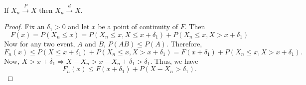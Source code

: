 \documentclass{article}
\begin{document}
\begin{prop}\label{c5p2}
If $X_n \stackrel{P}\rightarrow X$ then $X_n \stackrel{d}\rightarrow X$.
\end{prop}
\begin{proof}
Fix an $\delta_1 > 0$ and let $x$ be a point of continuity of $F$. Then
\[
F(x) = P(X_n \le x) = P(X_n \le x, X \le x + \delta_1) + 
P(X_n \le x, X > x + \delta_1)
\]
Now for any two event, $A$ and $B$, $P(AB) \le P(A)$. Therefore,
\[
F_n(x) \le P(X \le x + \delta_1) + P(X_n \le x, X > x + \delta_1) = 
F(x + \delta_1) + P(X_n \le x, X > x + \delta_1).
\]
Now, $X > x + \delta_1 \Rightarrow X - X_n > x - X_n + \delta_1 > \delta_1$.
Thus, we have
\begin{equation}\label{e1}
F_n(x) \le F(x + \delta_1) + P(X - X_n > \delta_1).
\end{equation}


\end{proof}
\end{document}
